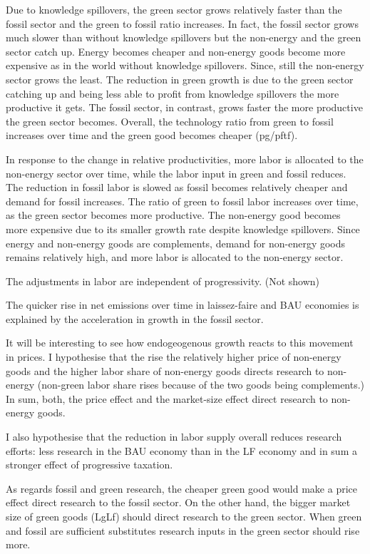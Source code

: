 \documentclass[12pt]{article}
\begin{document}
Due to knowledge spillovers, the green sector grows relatively faster than the fossil sector and the green to fossil ratio increases. In fact, the fossil sector grows much slower than without knowledge spillovers but the non-energy and the green sector catch up. Energy becomes cheaper and non-energy goods become more expensive as in the world without knowledge spillovers. Since, still the non-energy sector  grows the least. The reduction in green growth is due to the green sector catching up and being less able to profit from knowledge spillovers the more productive it gets. The fossil sector, in contrast, grows faster the more productive the green sector becomes. Overall, the technology ratio from green to fossil increases over time and the green good becomes cheaper (pg/pftf). 

In response to the change in relative productivities, more labor is allocated to the non-energy sector over time, while the labor input in green and fossil reduces. The reduction in fossil labor is slowed as fossil becomes relatively cheaper and demand for fossil increases. The ratio of green to fossil labor increases over time, as the green sector becomes more productive. The non-energy good becomes more expensive due to its smaller growth rate despite knowledge spillovers. Since energy and non-energy goods are complements, demand for non-energy goods remains relatively high, and more labor is allocated to the non-energy sector. 

The adjustments in labor are independent of progressivity. (Not shown)

The quicker rise in net emissions over time in laissez-faire and BAU economies is explained by the acceleration in growth in the fossil sector.

It will be interesting to see how endogeogenous growth reacts to this movement in prices. I hypothesise that the rise the relatively higher price of non-energy goods and the higher labor share of non-energy goods directs research to non-energy (non-green labor share rises because of the two goods being complements.) In sum, both, the price effect and the market-size effect direct research to non-energy goods. 

I also hypothesise that the reduction in labor supply overall reduces research efforts: less research in the BAU economy than in the LF economy and in sum a stronger effect of progressive taxation. 

As regards fossil and green research, the cheaper green good would make a price effect direct research to the fossil sector. On the other hand, the bigger market size of green goods (LgLf) should direct research to the green sector. When green and fossil are sufficient substitutes research inputs in the green sector should rise more. 
\end{document}
